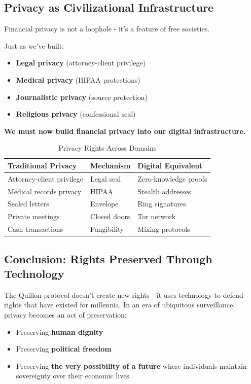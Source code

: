 \documentclass[12pt,a4paper]{article}
\begin{document}
\subsection{Privacy as Civilizational Infrastructure}

Financial privacy is not a loophole - it's a feature of free societies.

Just as we've built:
\begin{itemize}
\item \textbf{Legal privacy} (attorney-client privilege)
\item \textbf{Medical privacy} (HIPAA protections)
\item \textbf{Journalistic privacy} (source protection)
\item \textbf{Religious privacy} (confessional seal)
\end{itemize}

\textbf{We must now build financial privacy into our digital infrastructure.}

\begin{table}[h]
\centering
\begin{tabular}{lll}
\toprule
\textbf{Traditional Privacy} & \textbf{Mechanism} & \textbf{Digital Equivalent} \\
\midrule
Attorney-client privilege & Legal seal & Zero-knowledge proofs \\
Medical records privacy & HIPAA & Stealth addresses \\
Sealed letters & Envelope & Ring signatures \\
Private meetings & Closed doors & Tor network \\
Cash transactions & Fungibility & Mixing protocols \\
\bottomrule
\end{tabular}
\caption{Privacy Rights Across Domains}
\end{table}

\subsection{Conclusion: Rights Preserved Through Technology}

The Quillon protocol doesn't create new rights - it uses technology to defend rights that have existed for millennia. In an era of ubiquitous surveillance, privacy becomes an act of preservation:

\begin{itemize}
\item Preserving \textbf{human dignity}
\item Preserving \textbf{political freedom}
\item Preserving \textbf{the very possibility of a future} where individuals maintain sovereignty over their economic lives
\end{itemize}
\end{document}
